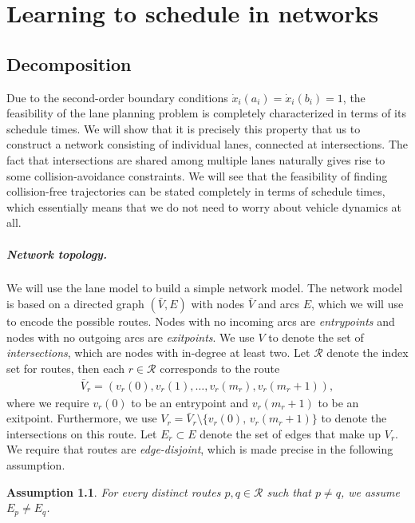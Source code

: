 \documentclass[a4paper]{report}
\theoremstyle{definition}
\theoremstyle{plain}
\newtheorem{assump}{Assumption}[chapter]
\begin{document}
\chapter{Learning to schedule in networks}\label{chap:network-learning}

\section{Decomposition}

Due to the second-order boundary conditions
$\dot{x}_{i}(a_{i}) = \dot{x}_{i}(b_{i}) = 1$, the feasibility of the lane
planning problem is completely characterized in terms of its schedule times.
%
We will show that it is precisely this property that us to construct a network
consisting of individual lanes, connected at intersections.
%
The fact that intersections are shared among multiple lanes naturally gives rise to some collision-avoidance constraints.
%
We will see that the feasibility of finding collision-free trajectories can be
stated completely in terms of schedule times, which essentially means that we do
not need to worry about vehicle dynamics at all.

\paragraph{Network topology.}

We will use the lane model to build a simple network model. The network model is
based on a directed graph $(\bar{V},E)$ with nodes $\bar{V}$ and arcs $E$, which
we will use to encode the possible routes.
%
Nodes with no incoming arcs are \textit{entrypoints} and nodes with no outgoing
arcs are \textit{exitpoints}.
%
We use $V$ to denote the set of \textit{intersections}, which are nodes with
in-degree at least two.
%
Let $\mathcal{R}$ denote the index set for routes, then each $r \in \mathcal{R}$
corresponds to the route
\begin{align*}
  \bar{V}_{r} = (v_{r}(0), v_{r}(1), \dots, v_{r}(m_{r}), v_{r}(m_{r}+1)) ,
\end{align*}
%
where we require $v_{r}(0)$ to be an entrypoint and $v_{r}(m_{r}+1)$ to be an
exitpoint. Furthermore, we use
$V_{r} = \bar{V}_{r} \setminus \{ v_{r}(0), \, v_{r}(m_{r}+1) \}$ to denote the
intersections on this route.
%
Let $E_{r} \subset E$ denote the set of edges that make up $V_{r}$.
%
We require that routes are \emph{edge-disjoint}, which is made precise in the
following assumption.

\begin{assump}\label{assump:disjoint-routes}
  For every distinct routes $p,q \in \mathcal{R}$ such that $p \neq q$, we
  assume $E_{p} \neq E_{q}$.
\end{assump}
\end{document}
